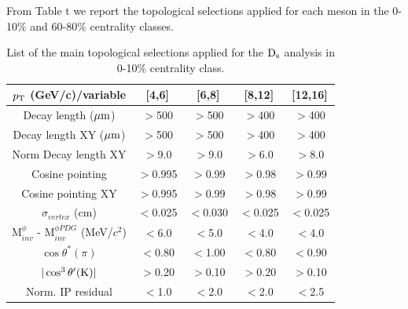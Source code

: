 From Table t we report the topological selections applied for each meson in the 0-10$\%$ and 60-80$\%$ centrality classes.
\begin{table}[!h]
 \caption{List of the main topological selections applied for the
   ${\rm D_s}$ analysis in 0-10\% centrality class.}
 \label{topologicalselections_ds_010}
 \begin{center}
  \begin{tabular}{|c|c|c|c|c|}
\hline
$p_{\rm T}$ (GeV/c)/variable &  [4,6] & [6,8] & [8,12] & [12,16] \\
\hline
\hline
Decay length ($\mathrm{\mu m}$)        & $>$500 & $>$500 & $>$400 & $>$400\\
\hline
Decay length XY ($\mathrm{\mu m}$)     & $>$500 & $>$500 & $>$400 & $>$400\\
\hline
Norm Decay length XY          & $>$9.0 & $>$9.0 & $>$6.0 & $>$8.0\\
\hline
Cosine pointing              & $>$0.995 & $>$0.99 & $>$0.98 & $>$0.99\\
\hline
Cosine pointing XY        & $>$0.995 & $>$0.99 & $>$0.98 & $>$0.99\\
\hline
$\sigma_{vertex}$  (cm)          &  $<$0.025 & $<$0.030 & $<$0.025 & $<$0.025\\
\hline
M$^{\phi}_{inv}$ - M$^{\phi PDG}_{inv}$ (MeV/$c^{2}$) & $<$6.0 & $<$5.0 & $<$4.0 & $<$4.0\\
\hline
$\cos \theta^*(\pi)$    &$<$0.80 & $<$1.00 & $<$0.80 & $<$0.90\\
\hline
$|\cos^3 \theta^\prime({\rm K})|$        & $>$0.20 & $>$0.10 & $>$0.20 & $>$0.10\\
\hline
Norm. IP residual   & $<$1.0 & $<$2.0 & $<$2.0 & $<$2.5 \\[1ex]
\hline
  \end{tabular}
 \end{center}
\end{table} 
